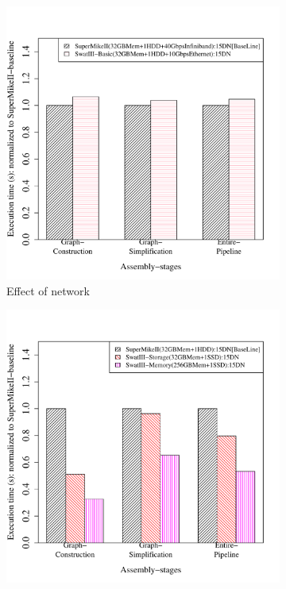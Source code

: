 \documentclass[conference]{IEEEtran}
\begin{document}
\begin{figure}[htb]
	\begin{subfigure}[b]{0.23\textwidth}
                \includegraphics[width=\textwidth]{Figure/PerormanceData/Plots/Network.pdf}
                \caption{Effect of network}
                \label{fig:SuperMikeSwatBasic}
        \end{subfigure}
 	\begin{subfigure}[b]{0.23\textwidth}
                \includegraphics[width=\textwidth]{Figure/PerormanceData/Plots/StorageMemory.pdf}

\end{subfigure}
\end{figure}
\end{document}
